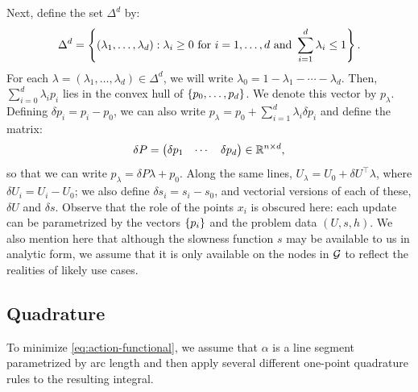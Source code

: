 \documentclass[sisc-eikonal.tex]{subfiles}
\begin{document}
Next, define the set $\Delta^d$ by:
\begin{equation}
  \Delta^d = \left\{(\lambda_1, \hdots, \lambda_d) : \lambda_i \geq 0 \mbox{ for } i = 1, \hdots, d \mbox{ and } \sum_{i=1}^d \lambda_i \leq 1\right\}.
\end{equation}
For each $\lambda = (\lambda_1, \hdots, \lambda_d) \in \Delta^d$, we
will write $\lambda_0 = 1 - \lambda_1 - \cdots - \lambda_d$. Then,
$\sum_{i=0}^d \lambda_i p_i$ lies in the convex hull of
$\left\{p_0, \hdots, p_d\right\}$. We denote this vector by
$p_\lambda$. Defining $\delta p_i = p_i - p_0$, we can also write
$p_\lambda = p_0 + \sum_{i=1}^d \lambda_i \delta p_i$ and define the
matrix:
\begin{equation}
  \delta P = \begin{pmatrix} \delta p_1 & \cdots & \delta p_d \end{pmatrix} \in \mathbb{R}^{n \times d},
\end{equation}
so that we can write $p_\lambda = \delta P \lambda + p_0$. Along the
same lines, $U_\lambda = U_0 + \delta U^\top \lambda$, where
$\delta U_i = U_i - U_0$; we also define $\delta s_i = s_i - s_0$, and
vectorial versions of each of these, $\delta U$ and $\delta
s$. Observe that the role of the points $x_i$ is obscured here: each
update can be parametrized by the vectors $\left\{p_i\right\}$ and the problem
data $(U, s, h)$. We also mention here that although the slowness
function $s$ may be available to us in analytic form, we assume that
it is only available on the nodes in $\mathcal{G}$ to reflect the realities
of likely use cases.

\subsection{Quadrature}\label{ssec:quadrature}

To minimize \cref{eq:action-functional}, we assume that $\alpha$ is a
line segment parametrized by arc length and then apply several
different one-point quadrature rules to the resulting integral.
\end{document}
